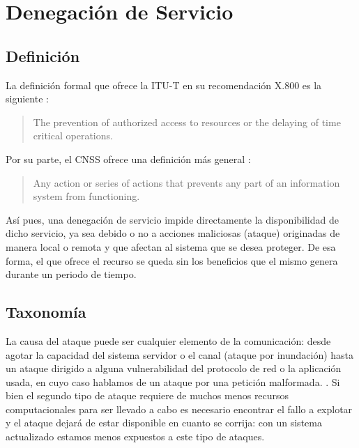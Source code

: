 \section{Denegación de Servicio}\label{sec:Denegacion de Servicio}
\subsection{Definición}\label{ssec:dos definicion}

La definición formal que ofrece la \gls{ITU-T} en su recomendación X.800 es la siguiente \cite{ITU-T_DDoS_def}:

\begin{quote}
 The prevention of authorized access to resources or the delaying of time critical operations.
\end{quote}

Por su parte, el \gls{CNSS} ofrece una definición más general \cite{CCNS_DDoS_def}:

\begin{quote}
 Any action or series of actions that prevents any part of an information system from functioning.
\end{quote}

Así pues, una denegación de servicio impide directamente la disponibilidad de dicho servicio, ya sea debido o no
a acciones maliciosas (ataque) originadas de manera local o remota y que afectan al sistema que se desea
proteger.
De esa forma, el que ofrece el recurso se queda sin los beneficios que el mismo genera durante un periodo de tiempo. %

\subsection{Taxonomía}\label{ssec:dos taxonomia}

La causa del ataque puede ser cualquier elemento de la comunicación: desde agotar
la capacidad del sistema servidor o el canal (ataque por inundación)
hasta un ataque dirigido a alguna vulnerabilidad del protocolo de red o la aplicación usada,
en cuyo caso hablamos de un ataque por una petición malformada.
\cite{Raghavan}. 
Si bien el segundo tipo  de ataque requiere de muchos menos recursos computacionales para
ser llevado a cabo es necesario encontrar el fallo a explotar y el ataque dejará de estar
disponible en cuanto se corrija: con un sistema actualizado estamos menos expuestos
a este tipo de ataques.


